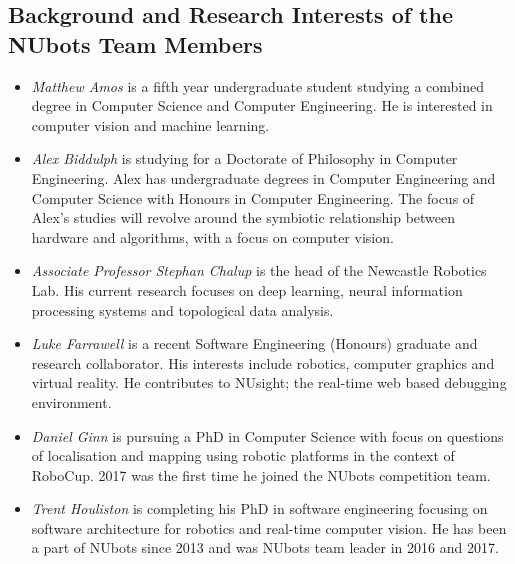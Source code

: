 \documentclass{llncs}
\begin{document}
\subsection{Background and Research Interests of the NUbots Team Members}

\begin{itemize}
\item \emph{Matthew Amos} is a fifth year undergraduate student studying a combined degree in Computer Science and Computer Engineering. He is interested in computer vision and machine learning.

\item \emph{Alex Biddulph} is studying for a Doctorate of Philosophy in Computer Engineering. Alex has undergraduate degrees in Computer Engineering and Computer Science with Honours in Computer Engineering. The focus of Alex's studies will revolve around the symbiotic relationship between hardware and algorithms, with a focus on computer vision.

\item \emph{Associate Professor Stephan Chalup} is the head of the Newcastle Robotics Lab. His current research focuses on deep learning, neural information processing systems and topological data analysis.

\item \emph{Luke Farrawell} is a recent Software Engineering (Honours) graduate and research collaborator. His interests include robotics, computer graphics and virtual reality. He contributes to NUsight; the real-time web based debugging environment.


\item \emph{Daniel Ginn} is pursuing a PhD in Computer Science with focus on questions of localisation and mapping using robotic platforms in the context of RoboCup. 2017 was the first time he joined the NUbots competition team.

\item \emph{Trent Houliston} is completing his PhD in software engineering focusing on software architecture for robotics and real-time computer vision. He has been a part of NUbots since 2013 and was NUbots team leader in 2016 and 2017.


\end{itemize}
\end{document}
